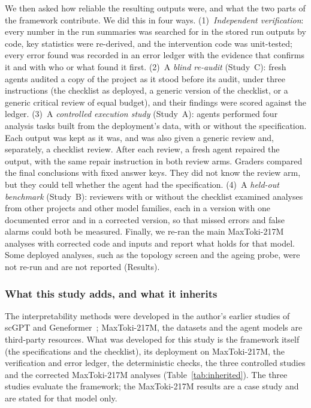 \documentclass[10pt,letterpaper]{article}
\begin{document}
We then asked how reliable the resulting outputs were, and what the two
parts of the framework contribute. We did this in four ways.
(1)~\emph{Independent verification}: every number in the run summaries was searched for in
the stored run outputs by code, key statistics were re-derived, and the
intervention code was unit-tested; every error found was recorded in an
error ledger with the evidence that confirms it and with who or what found
it first. (2)~A \emph{blind re-audit} (Study~C): fresh agents audited a
copy of the project as it stood before its audit, under three
instructions (the checklist as deployed, a generic version of the
checklist, or a generic critical review of equal budget), and their
findings were scored against the ledger. (3)~A \emph{controlled
execution study} (Study~A): agents performed four analysis tasks built
from the deployment's data, with or without the specification. Each
output was kept as it was, and was also given a generic review and,
separately, a checklist review. After each review, a fresh agent repaired
the output, with the same repair instruction in both review arms. Graders
compared the final conclusions with fixed answer keys. They did not know
the review arm, but they could tell whether the agent had the
specification. (4)~A \emph{held-out benchmark} (Study~B): reviewers with or
without the checklist examined analyses from other projects and other
model families, each in a version with one documented error and in a
corrected version, so that missed errors and false alarms could both be
measured. Finally, we re-ran the main MaxToki-217M analyses with corrected code
and inputs and report what holds for that model. Some deployed analyses,
such as the topology screen and the ageing probe, were not re-run and are
not reported (Results).

\subsubsection*{What this study adds, and what it inherits}
The interpretability methods were developed in the author's earlier
studies of scGPT and
Geneformer~\cite{anon2026attention,anon2026spectral,anon2026topology,anon2026sae,anon2026circuits,anon2026manifold,anon2026exhaustive,anon2026ageing};
MaxToki-217M, the datasets and the agent models are third-party
resources. What was developed for this study is the framework itself (the
specifications and the checklist), its deployment on MaxToki-217M, the
verification and error ledger, the deterministic checks, the three
controlled studies and the corrected MaxToki-217M analyses
(Table~\ref{tab:inherited}). The three studies evaluate the framework;
the MaxToki-217M results are a case study and are stated for that model
only.
\end{document}
